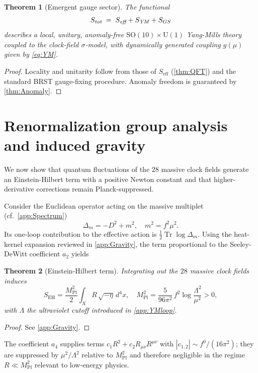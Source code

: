 \documentclass[pdflatex,sn-mathphys-num]{sn-jnl}
\theoremstyle{thmstyleone}
\newtheorem{theorem}{Theorem}
\theoremstyle{thmstyletwo}%
\theoremstyle{thmstylethree}%
\newcommand{\SO}[1]{\mathrm{SO(#1)}}
\newcommand{\U}[1]{\mathrm{U(#1)}}
\newcommand{\SOTen}{\SO{10}}
\newcommand{\UOne}{\U{1}}
\newcommand{\Tr}{\operatorname{Tr}}
\begin{document}
\begin{theorem}[Emergent gauge sector]\label{thm:GaugeSector}
The functional
\[
  S_{\emph{tot}}
  \;=\;
  S_{\emph{eff}}
  + S_{\text{\emph{YM}}}
  + S_{GS}
\]
describes a local, unitary, anomaly-free
\(\SOTen\times \UOne\) Yang-Mills theory coupled to the clock-field
$\sigma$-model, with dynamically generated coupling \(g(\mu)\) given by
\eqref{eq:YM}.
\end{theorem}

\begin{proof}
Locality and unitarity follow from those of
\(S_{\text{eff}}\) (\autoref{thm:QFT}) and the standard BRST gauge-fixing
procedure.  Anomaly freedom is guaranteed by
\autoref{thm:Anomaly}.
\end{proof}


\section{Renormalization group analysis and induced gravity}
\label{sec:7}
We now show that quantum fluctuations of the $28$ massive clock fields
generate an Einstein-Hilbert term with a positive Newton constant and
that higher-derivative corrections remain Planck-suppressed.

Consider the Euclidean operator acting on the massive multiplet
(cf.\ \autoref{app:Spectrum})
\[
  \Delta_{m}=-D^{2}+m^{2},
  \quad
  m^{2}=f^{2}\mu^{2}.
\]
Its one-loop contribution to the effective action is
\(
  \frac12\Tr\log\Delta_{m}
\).
Using the heat-kernel expansion reviewed in
\autoref{app:Gravity}, the term proportional to the
Seeley-DeWitt coefficient \(a_{2}\) yields

\begin{theorem}[Einstein-Hilbert term]\label{thm:EH}
Integrating out the $28$ massive clock fields induces
\[
  S_{\text{EH}}
  = \frac{M_{\text{Pl}}^{2}}{2}\int_{X}R\,\sqrt{-\eta}\,d^{4}x,
  \quad
  M_{\text{Pl}}^{2}
  = \frac{5}{96\pi^{2}}\,f^{2}
    \log\frac{\Lambda^{2}}{\mu^{2}}
  >0,
\]
with $\Lambda$ the ultraviolet cutoff introduced in \autoref{app:YMloop}.
\end{theorem}

\begin{proof}
See \autoref{app:Gravity}.
\end{proof}

The coefficient \(a_{4}\) supplies terms
\(c_{1}R^{2}+c_{2}R_{\mu\nu}R^{\mu\nu}\) with
\(|c_{1,2}| \sim f^{0}/(16\pi^{2})\);
they are suppressed by \(\mu^{2}/\Lambda^{2}\) relative to
\(M_{\text{Pl}}^{2}\) and therefore negligible in the regime
\(R\ll M_{\text{Pl}}^{2}\) relevant to low-energy physics.
\end{document}
